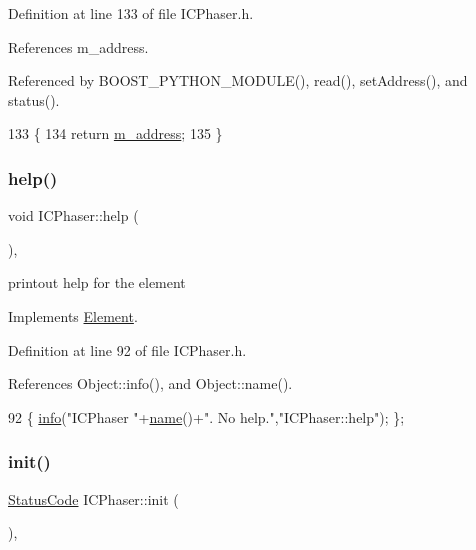 Definition at line 133 of file I\+C\+Phaser.\+h.



References m\+\_\+address.



Referenced by B\+O\+O\+S\+T\+\_\+\+P\+Y\+T\+H\+O\+N\+\_\+\+M\+O\+D\+U\+L\+E(), read(), set\+Address(), and status().


\begin{DoxyCode}
133               \{
134     \textcolor{keywordflow}{return} \hyperlink{classICPhaser_a2b3bdff684521d2c3d053662134043ca}{m\_address};
135   \}
\end{DoxyCode}
\mbox{\label{classICPhaser_a8650cfbe21e6dfa96f3a858507105f3b}} 
\subsubsection{\texorpdfstring{help()}{help()}}
{\footnotesize\ttfamily void I\+C\+Phaser\+::help (\begin{DoxyParamCaption}{ }\end{DoxyParamCaption})\hspace{0.3cm}{\ttfamily [inline]}, {\ttfamily [virtual]}}

printout help for the element 

Implements \hyperlink{classElement_a32c0de27acb08e17251cef88c3e9303a}{Element}.



Definition at line 92 of file I\+C\+Phaser.\+h.



References Object\+::info(), and Object\+::name().


\begin{DoxyCode}
92 \{ \hyperlink{classObject_a644fd329ea4cb85f54fa6846484b84a8}{info}(\textcolor{stringliteral}{"ICPhaser "}+\hyperlink{classObject_a300f4c05dd468c7bb8b3c968868443c1}{name}()+\textcolor{stringliteral}{". No help."},\textcolor{stringliteral}{"ICPhaser::help"}); \};
\end{DoxyCode}
\mbox{\label{classICPhaser_a798ede3a88e57efd1545b6594d2d7be5}} 
\subsubsection{\texorpdfstring{init()}{init()}}
{\footnotesize\ttfamily \hyperlink{classStatusCode}{Status\+Code} I\+C\+Phaser\+::init (\begin{DoxyParamCaption}{ }\end{DoxyParamCaption})\hspace{0.3cm}{\ttfamily [inline]}, {\ttfamily [virtual]}}

